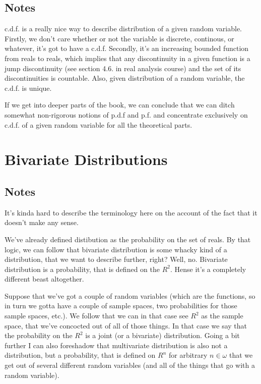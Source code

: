 \documentclass[11pt,oneside,titlepage]{book}
\begin{document}
\subsection*{Notes}

c.d.f. is a really nice way to describe distribution of a given random variable. Firstly,
we don't care whether or not the variable is discrete, continous, or whatever, it's got to
have a c.d.f. Secondly, it's an increasing bounded function from reals to reals, which implies
that any discontinuity in a given function is a jump discontinuity (see section 4.6. in real
analysis course) and the set of its discontinuities is countable. Also, given distribution
of a random variable, the c.d.f. is unique.

If we get into deeper parts of the book, we can conclude that we can ditch somewhat
non-rigorous notions of p.d.f and p.f. and concentrate exclusively on c.d.f. of a given
random variable for all the theoretical parts.



\section{Bivariate Distributions}

\subsection*{Notes}

It's kinda hard to describe the terminology here on the account of the
fact that it doesn't make any sense.

We've already defined distibution as the probability on the set of
reals. By that logic, we can follow that bivariate distribution is
some whacky kind of a distribution, that we want to describe further,
right?  Well, no. Bivariate distribution is a probability, that is
defined on the $R^2$. Hense it's a completely different beast altogether. 

Suppose that we've got a couple of random variables (which are the
functions, so in turn we gotta have a couple of sample spaces, two
probabilities for those sample spaces, etc.).  We follow that we can
in that case see $R^2$ as the
sample space, that we've concocted out of all of those things. In that
case we say that the probability on the $R^2$ is
a joint (or a bivariate) distribution. Going a bit further I can also
foreshadow that multivariate distribution is also not a distribution,
but a probability, that is defined on $R^n$ for arbitrary $n \in
\omega$ that we get out of several different random variables (and all
of the things that go with a random variable).
\end{document}
